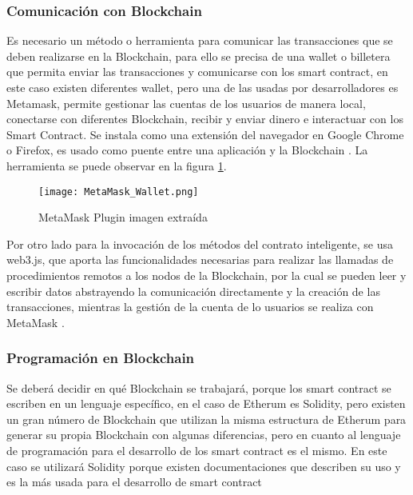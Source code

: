 \subsubsection{Comunicación con Blockchain}
Es necesario un método o herramienta para comunicar las transacciones que se deben realizarse 
en la Blockchain, para ello se precisa de una wallet o billetera que permita enviar las transacciones 
y comunicarse con los smart contract, en este caso existen diferentes wallet, pero una de las usadas por desarrolladores
es Metamask, permite gestionar las cuentas de los usuarios de manera local, conectarse con diferentes Blockchain, 
recibir y enviar dinero e interactuar con los Smart Contract.
Se instala como una extensión del navegador en Google Chrome o Firefox,  es usado como puente entre una aplicación y la Blockchain \cite[]{dannen_introducing_2017,metamask_introduction_2021}. 
La herramienta se puede observar en la figura \ref{img:metamask_wallet}.
\begin{figure}[H]
  \centering
  {\texttt{[image: MetaMask\_Wallet.png]}}
  \caption{MetaMask Plugin imagen extraída}
  \label{img:metamask_wallet}
\end{figure}
Por otro lado para la invocación de los métodos del contrato inteligente, se usa web3.js, que aporta las funcionalidades
necesarias para realizar las llamadas de procedimientos remotos a los nodos de la Blockchain, por la cual se pueden leer y escribir datos  abstrayendo la comunicación directamente 
y la creación de las transacciones, mientras la gestión de la cuenta de lo usuarios se realiza con MetaMask \cite[]{dannen_introducing_2017}.



\subsubsection{Programación en Blockchain}

Se deberá  decidir en qué  Blockchain se trabajará, porque los smart contract se escriben en un lenguaje específico,
en el caso de Etherum es Solidity, pero existen un gran número de  Blockchain que utilizan la misma estructura de Etherum para generar 
su propia  Blockchain con algunas diferencias, pero en cuanto al lenguaje de programación  para el desarrollo de los smart contract 
es el mismo. En este caso se utilizará Solidity porque existen documentaciones que describen su uso y es la más usada para el desarrollo de smart contract \cite[]{dannen_introducing_2017,ethereum_solidity_nodate}

